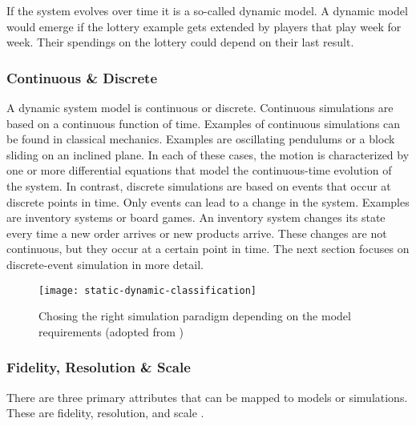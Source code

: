 If the system evolves over time it is a so-called dynamic model. A dynamic model would emerge if the lottery example gets extended by players that play week for week. Their spendings on the lottery could depend on their last result.


\subsubsection{Continuous \& Discrete}

A dynamic system model is continuous or discrete. Continuous simulations are based on a continuous function of time. Examples of continuous simulations can be found in classical mechanics. Examples are oscillating pendulums or a block sliding on an inclined plane. In each of these cases, the motion is characterized by one or more differential equations that model the continuous-time evolution of the system.
In contrast, discrete simulations are based on events that occur at discrete points in time. Only events can lead to a change in the system. Examples are inventory systems or board games.
An inventory system changes its state every time a new order arrives or new products arrive. These changes are not continuous, but they occur at a certain point in time.
The next section focuses on discrete-event simulation in more detail.

\begin{figure}[h!]
 \caption{Chosing the right simulation paradigm depending on the model requirements (adopted from \cite[page 3]{leemis2006discrete})}
 \centering
 \texttt{[image: static-dynamic-classification]}
\end{figure}


\subsubsection{Fidelity, Resolution \& Scale}

There are three primary attributes that can be mapped to models or simulations.
These are fidelity, resolution, and scale \cite{sokolowski2010modelingintro}.


